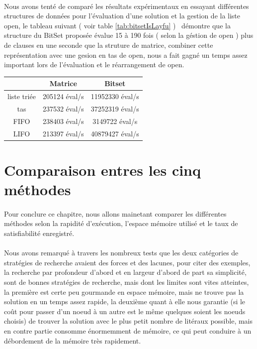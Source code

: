 \paragraph{}
Nous avons tenté de comparé les résultats expérimentaux en essayant différentes structures de données pour l'évaluation d'une solution et la gestion de la liste open, le tableau suivant ( voir table \ref{tab:bitsetIsLayfu} )  \ démontre que la structure du BitSet proposée évalue 15 à 190 fois ( selon la géstion de open ) plus de clauses en une seconde que la struture de matrice, combiner cette représentation avec une gesion en tas de open, nous a fait gagné un temps assez important lors de l'évaluation et le réarrangement de open.
\begin{center}\label{tab:bitsetIsLayfu}
	\begin{tabular}{|c | c| c|}
		\hline
		\backslashbox{gestion de open}{évaluation par}& Matrice & Bitset\\\hline
		liste triée& 205124 éval/s& 11952330 éval/s\\\hline
		tas & 237532 éval/s & 37252319 éval/s\\\hline
		FIFO & 238403 éval/s & 3149722 éval/s\\\hline
		LIFO & 213397 éval/s& 40879427 éval/s\\\hline
		\end{tabular}
\end{center}
		
		
		
\section{Comparaison entres les cinq méthodes}
\paragraph{}
Pour conclure ce chapitre, nous allons mainetant comparer les différentes méthodes selon la rapidité d'exécution, l'espace mémoire utilisé et le taux de satisfiabilité enregistré.
\paragraph{}
Nous avons remarqué à travers les nombreux tests que les deux catégories de stratégies de recherche avaient des forces et des lacunes, pour citer des exemples, la recherche par profondeur d'abord et en largeur d'abord de part sa simplicité, sont de bonnes stratégies de recherche, mais dont les limites sont vites atteintes, la première est certe peu gourmande en espace mémoire, mais ne trouve pas la solution en un temps assez rapide, la deuxième quant à elle nous garantie (si le coût pour passer d'un noeud à un autre est le même quelques soient les noeuds choisis) de trouver la solution avec le plus petit nombre de litéraux possible, mais en contre partie consomme énormemment de mémoire, ce qui peut conduire à un débordement de la mémoire très rapidement\label{BreadthIssueCompare}.
